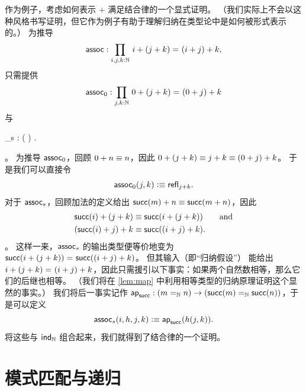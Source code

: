 作为例子，考虑如何表示 $+$ 满足结合律的一个显式证明。
（我们实际上不会以这种风格书写证明，但它作为例子有助于理解归纳在类型论中是如何被形式表示的。）
为推导
\[\assoc : \prd{i,j,k:\nat} \id{i + (j + k)}{(i + j) + k}, \]
只需提供
\[ \assoc_0 :  \prd{j,k:\nat} \id{0 + (j + k)}{(0+ j) + k} \]
与
\begin{narrowmultline*}
  \assoc_s  :  \left( \right)
   \narrowbreak
   \to {} .
\end{narrowmultline*}。
为推导 $\mathsf{assoc}_0$，回顾 $0+n \equiv n$，因此 $0 + (j + k) \equiv j+k \equiv (0+ j) + k$。
于是我们可以直接令
\[ \mathsf{assoc}_0(j,k) \vcentcolon\equiv \mathsf{refl}_{j+k}. \]
对于 $\mathsf{assoc}_s$，回顾加法的定义给出 $\mathsf{succ}(m)+n \equiv \mathsf{succ}(m+n)$，因此
\begin{align*}
   \mathsf{succ}(i) + (j + k)  &\equiv \mathsf{succ}(i+(j+k)) \qquad\text{and}\\
   (\mathsf{succ}(i)+j)+k &\equiv \mathsf{succ}((i+j)+k).
\end{align*}。
这样一来，$\mathsf{assoc}_s$ 的输出类型便等价地变为 $\mathsf{succ}(i+(j+k)) =_{} \mathsf{succ}((i+j)+k)$。
但其输入（即``归纳假设''）
%
%
能给出 $i+(j+k) =_{} (i+j)+k$，因此只需援引以下事实：如果两个自然数相等，那么它们的后继也相等。
（我们将在 \cref{lem:map} 中利用相等类型的归纳原理证明这个显然的事实。）
我们将后一事实记作
$\apfunc{\suc} : %
(\id[\nat]{m}{n}) \to (\id[\nat]{\suc(m)}{\suc(n)})$，于是可以定义
\[\assoc_s(i,h,j,k) \defeq \apfunc{\suc}( %
h(j,k)). \]
将这些与 $\mathsf{ind}_{\mathbb{N}}$ 组合起来，我们就得到了结合律的一个证明。

%

\section{模式匹配与递归}
\label{sec:pattern-matching}

